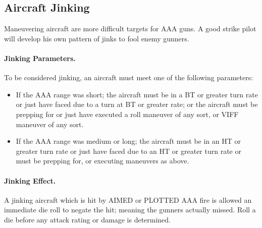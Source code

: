 \begin{advancedrules}

\section{Aircraft Jinking}



Maneuvering aircraft are more difficult targets for AAA guns. A good strike pilot will develop his own pattern of jinks to fool enemy gunners. 

\paragraph{Jinking Parameters.} To be considered jinking, an aircraft must meet one of the following parameters:

\begin{itemize}
    \item If the AAA range was short; the aircraft must be in a BT or greater turn rate or just have faced due to a turn at BT or greater rate; or the aircraft must be prepping for or just have executed a roll maneuver of any sort, or VIFF maneuver of any sort.

    \item If the AAA range was medium or long; the aircraft must be in an HT or greater turn rate or just have faced due to an HT or greater turn rate or must be prepping for, or executing maneuvers as above.
\end{itemize}

 

\paragraph{Jinking Effect.} A jinking aircraft which is hit by AIMED or PLOTTED AAA fire is allowed an immediate die roll to negate the hit; meaning the gunners actually missed. Roll a die before any attack rating or damage is determined.


\end{advancedrules}
